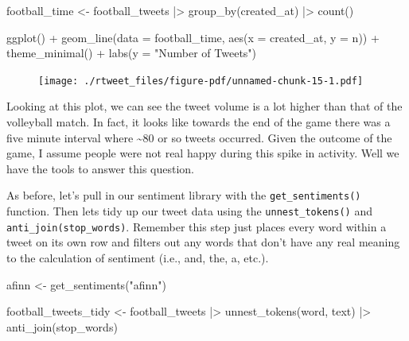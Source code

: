 \documentclass[
  letterpaper,
  DIV=11,
  numbers=noendperiod]{scrreprt}
\newenvironment{Shaded}{\begin{snugshade}}{\end{snugshade}}
\newcommand{\AttributeTok}[1]{\textcolor[rgb]{0.40,0.45,0.13}{#1}}
\newcommand{\FunctionTok}[1]{\textcolor[rgb]{0.28,0.35,0.67}{#1}}
\newcommand{\NormalTok}[1]{\textcolor[rgb]{0.00,0.23,0.31}{#1}}
\newcommand{\OtherTok}[1]{\textcolor[rgb]{0.00,0.23,0.31}{#1}}
\newcommand{\SpecialCharTok}[1]{\textcolor[rgb]{0.37,0.37,0.37}{#1}}
\newcommand{\StringTok}[1]{\textcolor[rgb]{0.13,0.47,0.30}{#1}}
\begin{document}
\begin{Shaded}
\begin{Highlighting}[]
\NormalTok{football\_time }\OtherTok{\textless{}{-}}\NormalTok{ football\_tweets }\SpecialCharTok{|\textgreater{}}
  \FunctionTok{group\_by}\NormalTok{(created\_at) }\SpecialCharTok{|\textgreater{}} 
  \FunctionTok{count}\NormalTok{()}

\FunctionTok{ggplot}\NormalTok{() }\SpecialCharTok{+}
  \FunctionTok{geom\_line}\NormalTok{(}\AttributeTok{data =}\NormalTok{ football\_time, }\FunctionTok{aes}\NormalTok{(}\AttributeTok{x =}\NormalTok{ created\_at, }\AttributeTok{y =}\NormalTok{ n)) }\SpecialCharTok{+}
  \FunctionTok{theme\_minimal}\NormalTok{() }\SpecialCharTok{+}
  \FunctionTok{labs}\NormalTok{(}\AttributeTok{y =} \StringTok{"Number of Tweets"}\NormalTok{)}
\end{Highlighting}
\end{Shaded}

\begin{figure}[H]

{\centering \texttt{[image: ./rtweet\_files/figure-pdf/unnamed-chunk-15-1.pdf]}

}

\end{figure}

Looking at this plot, we can see the tweet volume is a lot higher than
that of the volleyball match. In fact, it looks like towards the end of
the game there was a five minute interval where \textasciitilde80 or so
tweets occurred. Given the outcome of the game, I assume people were not
real happy during this spike in activity. Well we have the tools to
answer this question.

As before, let's pull in our sentiment library with the
\texttt{get\_sentiments()} function. Then lets tidy up our tweet data
using the \texttt{unnest\_tokens()} and
\texttt{anti\_join(stop\_words)}. Remember this step just places every
word within a tweet on its own row and filters out any words that don't
have any real meaning to the calculation of sentiment (i.e., and, the,
a, etc.).

\begin{Shaded}
\begin{Highlighting}[]
\NormalTok{afinn }\OtherTok{\textless{}{-}} \FunctionTok{get\_sentiments}\NormalTok{(}\StringTok{"afinn"}\NormalTok{)}

\NormalTok{football\_tweets\_tidy }\OtherTok{\textless{}{-}}\NormalTok{ football\_tweets }\SpecialCharTok{|\textgreater{}} 
  \FunctionTok{unnest\_tokens}\NormalTok{(word, text) }\SpecialCharTok{|\textgreater{}} 
  \FunctionTok{anti\_join}\NormalTok{(stop\_words) }
\end{Highlighting}
\end{Shaded}
\end{document}
